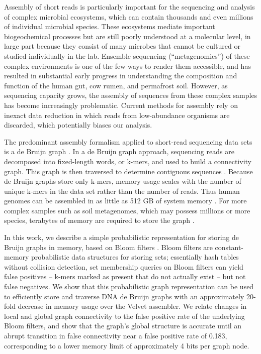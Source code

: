 \documentclass[12pt]{article} \usepackage{simplemargins}
\begin{document}
Assembly of short reads is particularly important for the sequencing
and analysis of complex microbial ecosystems, which can contain
thousands and even millions of individual microbial species.  These
ecosystems mediate important biogeochemical processes but are still
poorly understood at a molecular level, in large part because they
consist of many microbes that cannot be cultured or studied
individually in the lab.  Ensemble sequencing (``metagenomics'') of
these complex environments is one of the few ways to render them
accessible, and has resulted in substantial early progress in
understanding the composition and function of the human gut, cow
rumen, and permafrost soil.  However, as sequencing capacity grows,
the assembly of sequences from these complex samples has become
increasingly problematic.  Current methods for assembly rely on
inexact data reduction in which reads from low-abundance organisms are
discarded, which potentially biases our analysis.


The predominant assembly formalism applied to short-read sequencing
data sets is a de Bruijn graph \cite{pubmed20211242,pubmed22068540}.
In a de Bruijn graph approach, sequencing reads are decomposed into
fixed-length words, or k-mers, and used to build a connectivity graph.
This graph is then traversed to determine contiguous sequences
\cite{pubmed22068540}.  Because de Bruijn graphs store only k-mers,
memory usage scales with the number of unique k-mers in the data set
rather than the number of reads.  Thus human genomes can be assembled
in as little as 512 GB of system memory \cite{pmid21187386}.  For more
complex samples such as soil metagenomes, which may possess millions
or more species, terabytes of memory are required to store the graph
\cite{pubmed21304727}.

In this work, we describe a simple probabilistic representation for
storing de Bruijn graphs in memory, based on Bloom filters
\cite{bloom}.  Bloom filters are constant-memory probabilistic data
structures for storing sets; essentially hash tables without collision
detection, set membership queries on Bloom filters can yield false
positives -- k-mers marked as present that do not actually exist --
but not false negatives.  We show that this probabilistic graph
representation can be used to efficiently store and traverse DNA de
Bruijn graphs with an approximately 20-fold decrease in memory usage
over the Velvet assembler. We relate changes in local and global graph
connectivity to the false positive rate of the underlying Bloom
filters, and show that the graph's global structure is accurate until
an abrupt transition in false connectivity near a false positive rate
of 0.183, corresponding to a lower memory limit of approximately 4
bits per graph node.
\end{document}
